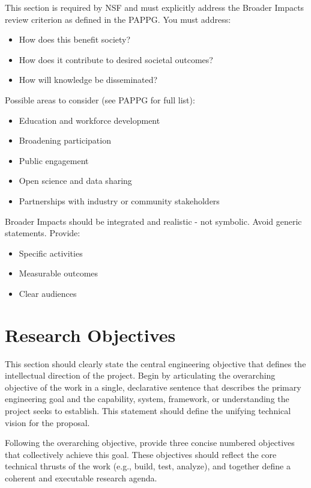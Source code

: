 \documentclass[11pt,letterpaper]{article}
\begin{document}
{This section is required by NSF and must explicitly address the Broader Impacts review criterion as defined in the PAPPG.
You must address:
\begin{itemize}
    \item How does this benefit society?
    \item How does it contribute to desired societal outcomes?
    \item How will knowledge be disseminated?
\end{itemize}
Possible areas to consider (see PAPPG for full list):
\begin{itemize}
    \item Education and workforce development
    \item Broadening participation
    \item Public engagement
    \item Open science and data sharing
    \item Partnerships with industry or community stakeholders
\end{itemize}
Broader Impacts should be integrated and realistic - not symbolic.
Avoid generic statements. Provide:
\begin{itemize}
    \item Specific activities
    \item Measurable outcomes
    \item Clear audiences
\end{itemize}

\section{Research Objectives}

This section should clearly state the central engineering objective that defines the intellectual direction of the project. Begin by articulating the overarching objective of the work in a single, declarative sentence that describes the primary engineering goal and the capability, system, framework, or understanding the project seeks to establish. This statement should define the unifying technical vision for the proposal.

Following the overarching objective, provide three concise numbered objectives that collectively achieve this goal. These objectives should reflect the core technical thrusts of the work (e.g., build, test, analyze), and together define
a coherent and executable research agenda.

}
\end{document}
